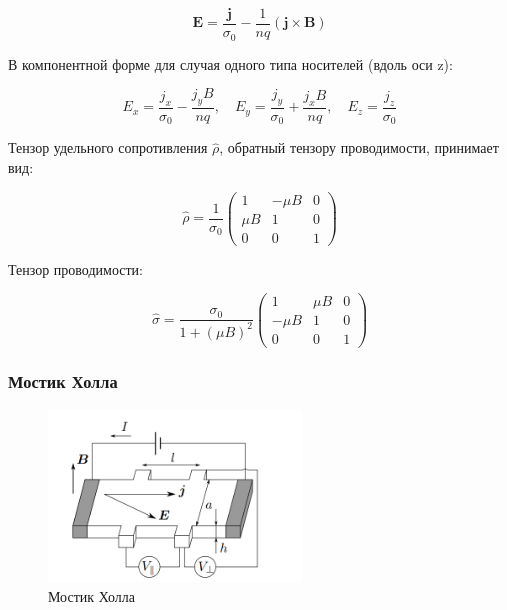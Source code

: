 \begin{equation}
\mathbf{E} = \frac{\mathbf{j}}{\sigma_0} - \frac{1}{nq} (\mathbf{j} \times \mathbf{B})
\end{equation}

В компонентной форме для случая одного типа носителей (вдоль оси z):

\begin{equation}
E_x = \frac{j_x}{\sigma_0} - \frac{j_y B}{nq}, \quad E_y = \frac{j_y}{\sigma_0} + \frac{j_x B}{nq}, \quad E_z = \frac{j_z}{\sigma_0}
\end{equation}

Тензор удельного сопротивления \( \hat{\rho} \), обратный тензору проводимости, принимает вид:

\begin{equation}
\hat{\rho} =
\frac{1}{\sigma_0}
\begin{pmatrix}
1 & -\mu B & 0 \\
\mu B & 1 & 0 \\
0 & 0 & 1
\end{pmatrix}
\end{equation}

Тензор проводимости:

\begin{equation}
\hat{\sigma} = \frac{\sigma_0}{1 + (\mu B)^2}
\begin{pmatrix}
1 & \mu B & 0 \\
-\mu B & 1 & 0 \\
0 & 0 & 1
\end{pmatrix}
\end{equation}

\subsubsection{Мостик Холла}

\begin{figure}[H]
    \centering
    \includegraphics[width=0.6\textwidth]{pictures/r3.png}
    \caption{Мостик Холла}
\end{figure}

